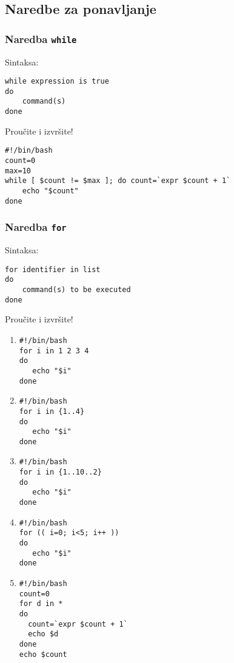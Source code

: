 \subsection*{Naredbe za ponavljanje}

 \subsubsection*{Naredba \texttt{while}}
Sintaksa:
\begin{lstlisting}
while expression is true
do
    command(s)
done
\end{lstlisting}

\begin{primjer} Proučite i izvršite!
\begin{lstlisting}
#!/bin/bash
count=0
max=10
while [ $count != $max ]; do count=`expr $count + 1`
    echo "$count"
done
\end{lstlisting}
\end{primjer}

\subsubsection*{Naredba \texttt{for}}
Sintaksa:
\begin{lstlisting}
for identifier in list
do
    command(s) to be executed
done
\end{lstlisting}

\begin{primjer} Proučite i izvršite!
\begin{enumerate}
 \item
\begin{lstlisting}
#!/bin/bash
for i in 1 2 3 4 
do
   echo "$i"
done 
\end{lstlisting}

\item 
\begin{lstlisting}
#!/bin/bash
for i in {1..4}
do
   echo "$i"
done 
\end{lstlisting}

\item 
\begin{lstlisting}
#!/bin/bash
for i in {1..10..2}
do
   echo "$i"
done 
\end{lstlisting}

\item 
\begin{lstlisting}
#!/bin/bash
for (( i=0; i<5; i++ ))
do
   echo "$i"
done 
\end{lstlisting}

\item 
\begin{lstlisting}
#!/bin/bash
count=0
for d in *
do
  count=`expr $count + 1`
  echo $d
done
echo $count
\end{lstlisting}
\end{enumerate}
\end{primjer}


